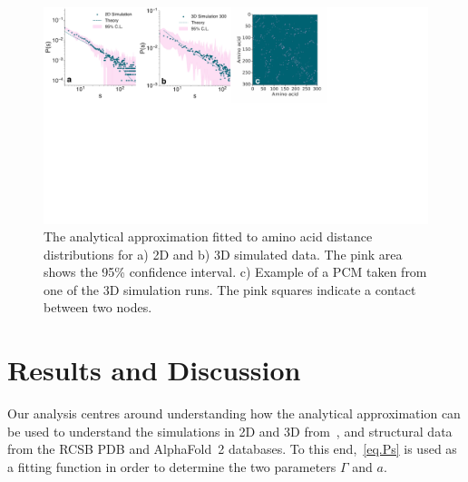 \documentclass[10pt]{iopart}
\begin{document}
 \begin{figure}[htb]
        \centering
	\includegraphics[width=\textwidth]{paper/figures/Fig3/Fig3.pdf}
	    \caption{The analytical approximation fitted to amino acid distance distributions for a) 2D and b) 3D simulated data. The pink area shows the 95\% confidence interval. c) Example of a PCM taken from one of the 3D simulation runs. The pink squares indicate a contact between two nodes.}
        \label{fig:2d_sim}
\end{figure}


\section{Results and Discussion}\label{sec:results}
Our analysis centres around understanding how the analytical approximation can be used to understand the simulations in 2D and 3D from~\cite{molkenthin2016scaling,molkenthin2020self}, and structural data from the RCSB PDB and AlphaFold~2 databases. To this end,~\ref{eq.Ps} is used as a fitting function in order to determine the two parameters $\Gamma$ and $a$.
\end{document}
